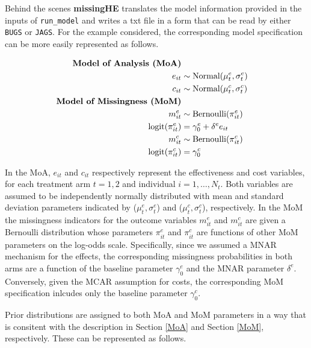 \documentclass[]{article}
\begin{document}
Behind the scenes \textbf{missingHE} translates the model information
provided in the inputs of \texttt{run\_model} and writes a txt file in a
form that can be read by either \texttt{BUGS} or \texttt{JAGS}. For the
example considered, the corresponding model specification can be more
easily represented as follows.

\begin{align*}
\hspace*{-5cm}
\mbox{\textbf{Model of Analysis (MoA)}}\\
e_{it}&\sim \mbox{Normal}(\mu^{e}_{t},\sigma^{e}_{t})\\
c_{it}&\sim \mbox{Normal}(\mu^{c}_{t},\sigma^{c}_{t})\\
\mbox{\textbf{Model of Missingness (MoM)}}\\
m^{e}_{it}&\sim \mbox{Bernoulli}(\pi^{e}_{it})\\
\mbox{logit}(\pi^{e}_{it})&=\gamma^{e}_{0}+\delta^{e}e_{it}\\
m^{c}_{it}&\sim \mbox{Bernoulli}(\pi^{c}_{it})\\
\mbox{logit}(\pi^{c}_{it})&=\gamma^{c}_{0}\\
\end{align*}

In the MoA, \(e_{it}\) and \(c_{it}\) respectively represent the
effectiveness and cost variables, for each treatment arm \(t=1,2\) and
individual \(i=1,\ldots,N_{t}\). Both variables are assumed to be
independently normally distributed with mean and standard deviation
parameters indicated by (\(\mu^{e}_{t},\sigma^{e}_{t}\)) and
(\(\mu^{c}_{t},\sigma^{c}_{t}\)), respectively. In the MoM the
missingness indicators for the outcome variables \(m^{e}_{it}\) and
\(m^{c}_{it}\) are given a Bernoulli distribution whose parameters
\(\pi^{e}_{it}\) and \(\pi^{c}_{it}\) are functions of other MoM
parameters on the log-odds scale. Specifically, since we assumed a MNAR
mechanism for the effects, the corresponding missingness probabilities
in both arms are a function of the baseline parameter \(\gamma^{e}_{0}\)
and the MNAR parameter \(\delta^{e}\). Conversely, given the MCAR
assumption for costs, the corresponding MoM specification inlcudes only
the baseline parameter \(\gamma^{c}_{0}\).

Prior distributions are assigned to both MoA and MoM parameters in a way
that is consitent with the description in Section \ref{MoA} and Section
\ref{MoM}, respectively. These can be represented as follows.
\end{document}
